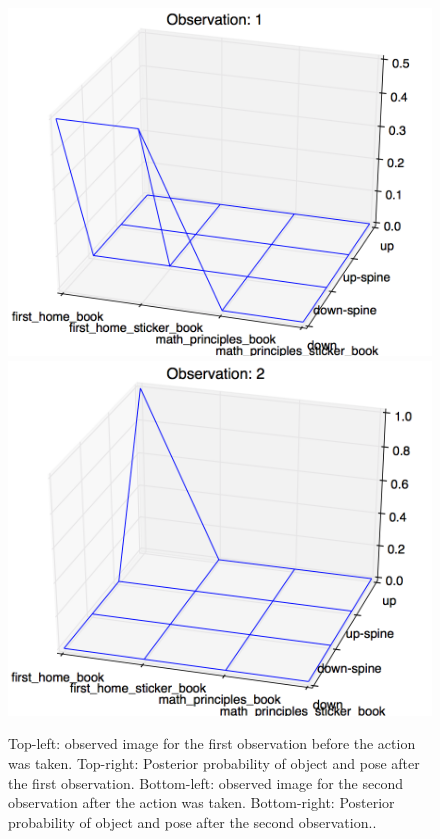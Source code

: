    \begin{figure}
    		\includegraphics[width = 0.6\columnwidth]{pics/experimentObs1.png}\\
    		\includegraphics[width = 0.6\columnwidth]{pics/experimentObs2.png}

	\caption{ Top-left: observed image for the first observation before the action was taken. Top-right: Posterior probability of object and pose after the first observation.	Bottom-left: observed image for the second observation after the action was taken. Bottom-right: Posterior probability of object and pose after the second observation..}
    	\label{fig:posteriors}
    \end{figure}
    
